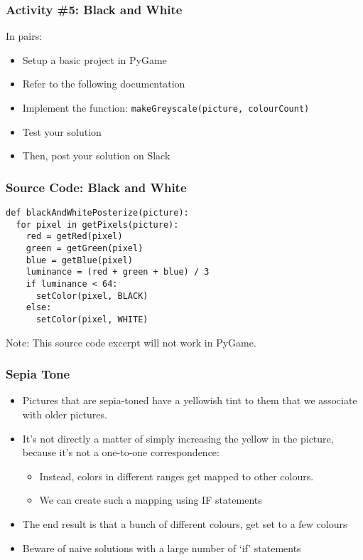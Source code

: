 \begin{frame}
	\frametitle{Activity \#5: Black and White}
	
	In pairs:
	
	\vspace{2em}
	
	\begin{itemize}		
		\item Setup a basic project in PyGame
		\item Refer to the following documentation
		\item Implement the function: \texttt{makeGreyscale(picture, colourCount)}
		\item Test your solution
		\item Then, post your solution on Slack
	\end{itemize}
\end{frame}

\begin{frame}[fragile]
	\frametitle{Source Code: Black and White}
	
\begin{lstlisting}
def blackAndWhitePosterize(picture):
  for pixel in getPixels(picture):
    red = getRed(pixel)
    green = getGreen(pixel)
    blue = getBlue(pixel)
    luminance = (red + green + blue) / 3
    if luminance < 64:
      setColor(pixel, BLACK)
    else:
      setColor(pixel, WHITE)
\end{lstlisting}

Note: This source code excerpt will not work in PyGame.

\end{frame}

\begin{frame}
	\frametitle{Sepia Tone}
	
	\begin{itemize}		
		\item Pictures that are sepia-toned have a yellowish tint to them that we associate with older pictures.
		\item It's not directly a matter of simply increasing the yellow in the picture, because it's not a one-to-one correspondence:
		\begin{itemize}
			\item Instead, colors in different ranges get mapped to other colours.
			\item We can create such a mapping using IF statements
		\end{itemize}	
		\item The end result is that a bunch of different colours, get set to a few colours
		\item Beware of naive solutions with a large number of `if' statements
	\end{itemize}
\end{frame}

